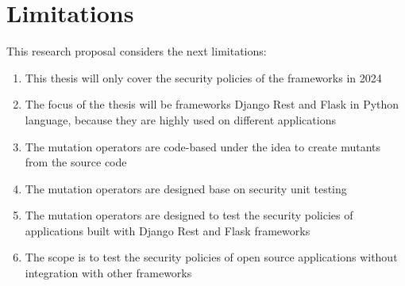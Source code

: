 \section{Limitations}

This research proposal considers the next limitations:

\begin{enumerate}
    \item This thesis will only cover the security policies of the frameworks in 2024
    \item The focus of the thesis will be frameworks Django Rest and Flask in Python language, because they are highly used on different applications
    \item The mutation operators are code-based under the idea to create mutants from the source code
    \item The mutation operators are designed base on security unit testing
    \item The mutation operators are designed to test the security policies of applications built with Django Rest and Flask frameworks
    \item The scope is to test the security policies of open source applications without integration with other frameworks
\end{enumerate}
